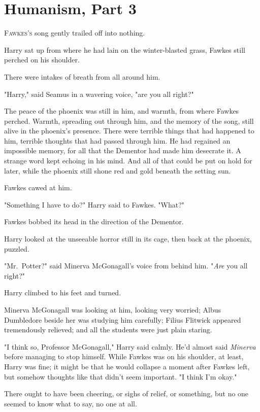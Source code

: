 \chapter{Humanism, Part 3}

\lettrine{F}{awkes's} song
gently trailed off into nothing.

Harry sat up from where he had lain on the winter-blasted grass, Fawkes still
perched on his shoulder.

There were intakes of breath from all around him.

"Harry," said Seamus in a wavering voice, "are you all right?"

The peace of the phoenix was still in him, and warmth, from where Fawkes
perched. Warmth, spreading out through him, and the memory of the song, still
alive in the phoenix's presence. There were terrible things that had happened
to him, terrible thoughts that had passed through him. He had regained an
impossible memory, for all that the Dementor had made him desecrate it. A
strange word kept echoing in his mind. And all of that could be put on hold for
later, while the phoenix still shone red and gold beneath the setting sun.

Fawkes cawed at him.

"Something I have to do?" Harry said to Fawkes. "What?"

Fawkes bobbed its head in the direction of the Dementor.

Harry looked at the unseeable horror still in its cage, then back at the
phoenix, puzzled.

"Mr.~Potter?" said Minerva McGonagall's voice from behind him. "\emph{Are} you
all right?"

Harry climbed to his feet and turned.

Minerva McGonagall was looking at him, looking very worried; Albus Dumbledore
beside her was studying him carefully; Filius Flitwick appeared tremendously
relieved; and all the students were just plain staring.

"I think so, Professor McGonagall," Harry said calmly. He'd almost said
\emph{Minerva} before managing to stop himself. While Fawkes was on his
shoulder, at least, Harry was fine; it might be that he would collapse a moment
after Fawkes left, but somehow thoughts like that didn't seem important. "I
think I'm okay."

There ought to have been cheering, or sighs of relief, or something, but no one
seemed to know what to say, no one at all.

